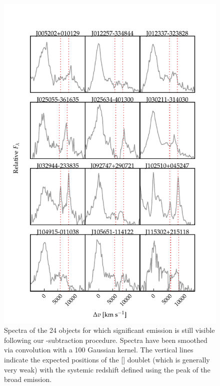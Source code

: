 \begin{figure}
    \centering
    \includegraphics[width=\columnwidth]{figures/chapter04/example_spectrum_grid_extreme_fe_1.pdf} 
    \caption[{Spectra of the 24 objects for which significant  emission is still visible following our -subtraction procedure.}]{Spectra of the 24 objects for which significant  emission is still visible following our -subtraction procedure. Spectra have been smoothed via convolution with a 100 \kms Gaussian kernel. The vertical lines indicate the expected positions of the [] doublet (which is generally very weak) with the systemic redshift defined using the peak of the broad \hb emission.}     
    \label{fig:bad_fe}
\end{figure}

